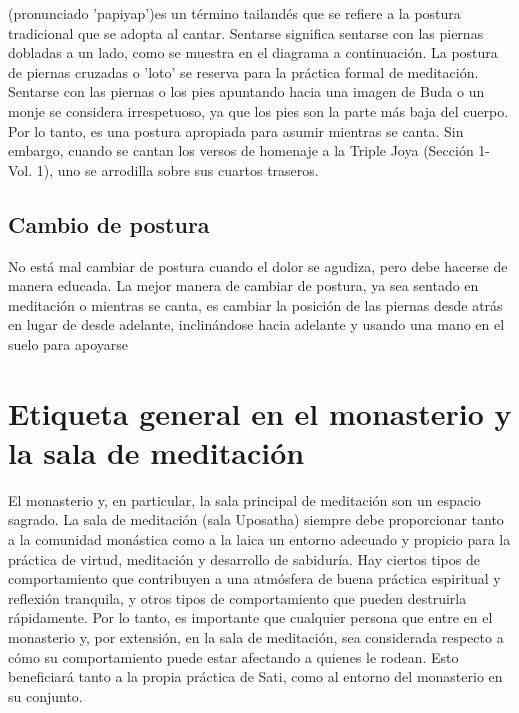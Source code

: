  \restoreFont{} (pronunciado 'papiyap')es un término tailandés que se refiere a la postura tradicional que se adopta al cantar. Sentarse  \restoreFont{} significa sentarse con las piernas dobladas a un lado, como se muestra en el diagrama a continuación. La postura de piernas cruzadas o 'loto' se reserva para la práctica formal de meditación. Sentarse con las piernas o los pies apuntando hacia una imagen de Buda o un monje se considera irrespetuoso, ya que los pies son la parte más baja del cuerpo. Por lo tanto,  \restoreFont{} es una postura apropiada para asumir mientras se canta. Sin embargo, cuando se cantan los versos de homenaje a la Triple Joya (Sección 1-Vol. 1), uno se arrodilla sobre sus cuartos traseros. 

\flushleft
\subsection{Cambio de postura}


No está mal cambiar de postura cuando el dolor se agudiza, pero debe hacerse de manera educada. La mejor manera de cambiar de postura, ya sea sentado en meditación o mientras se canta, es cambiar la posición de las piernas desde atrás en lugar de desde adelante, inclinándose hacia adelante y usando una mano en el suelo para apoyarse

\section{Etiqueta general en el monasterio y la sala de meditación}

El monasterio y, en particular, la sala principal de meditación son un espacio sagrado. La sala de meditación (sala Uposatha) siempre debe proporcionar tanto a la comunidad monástica como a la laica un entorno adecuado y propicio para la práctica de virtud, meditación y desarrollo de sabiduría. Hay ciertos tipos de comportamiento que contribuyen a una atmósfera de buena práctica espiritual y reflexión tranquila, y otros tipos de comportamiento que pueden destruirla rápidamente. Por lo tanto, es importante que cualquier persona que entre en el monasterio y, por extensión, en la sala de meditación, sea considerada respecto a cómo su comportamiento puede estar afectando a quienes le rodean. Esto beneficiará tanto a la propia práctica de Sati, como al entorno del monasterio en su conjunto.

